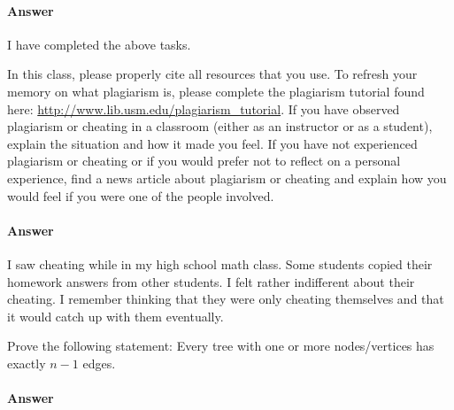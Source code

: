 \documentclass{article}
\begin{document}
\paragraph{Answer}


I have completed the above tasks.



\nextprob
{}

    In this class,
    please properly cite all resources that you use.
    To refresh your memory on what plagiarism is,
    please
    complete the plagiarism tutorial found here:
    \url{http://www.lib.usm.edu/plagiarism_tutorial}.
    If you have observed plagiarism or cheating in a classroom (either as an
    instructor or as a student), explain the situation and how it made you
    feel.  If you have not experienced plagiarism or cheating or if you would
    prefer not to reflect on a personal experience, find a news
    article about plagiarism or cheating and explain how you would feel if you
    were one of the people involved.

\paragraph{Answer}


I saw cheating while in my high school math class.
Some students copied their homework answers from other students.
I felt rather indifferent about their cheating.
I remember thinking that they were only cheating themselves and that it would catch up with them eventually.




\nextprob
{}

Prove the following statement: Every tree with one or more nodes/vertices has
exactly $n-1$ edges.

\paragraph{Answer}

\end{document}
